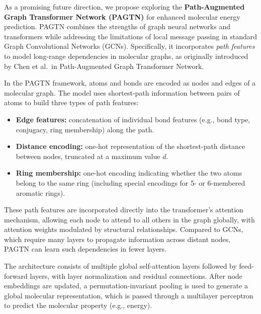 \documentclass{article}
\begin{document}
As a promising future direction, we propose exploring the \textbf{Path-Augmented Graph Transformer Network (PAGTN)} for enhanced molecular energy prediction. PAGTN combines the strengths of graph neural networks and transformers while addressing the limitations of local message passing in standard Graph Convolutional Networks (GCNs). Specifically, it incorporates \emph{path features} to model long-range dependencies in molecular graphs, as originally introduced by Chen et al.\ in Path-Augmented Graph Transformer Network. \newline

In the PAGTN framework, atoms and bonds are encoded as nodes and edges of a molecular graph. The model uses shortest-path information between pairs of atoms to build three types of path features: \newline
\begin{itemize}
    \item \textbf{Edge features:} concatenation of individual bond features (e.g., bond type, conjugacy, ring membership) along the path.
    \vspace{0.2cm}
    \item \textbf{Distance encoding:} one-hot representation of the shortest-path distance between nodes, truncated at a maximum value $d$.
    \vspace{0.2cm}
    \item \textbf{Ring membership:} one-hot encoding indicating whether the two atoms belong to the same ring (including special encodings for 5- or 6-membered aromatic rings).
    \vspace{0.2cm}
  \end{itemize}

These path features are incorporated directly into the transformer’s attention mechanism, allowing each node to attend to all others in the graph globally, with attention weights modulated by structural relationships. Compared to GCNs, which require many layers to propagate information across distant nodes, PAGTN can learn such dependencies in fewer layers. \newline

The architecture consists of multiple global self-attention layers followed by feed-forward layers, with layer normalization and residual connections. After node embeddings are updated, a permutation-invariant pooling is used to generate a global molecular representation, which is passed through a multilayer perceptron to predict the molecular property (e.g., energy). \newline
\end{document}

